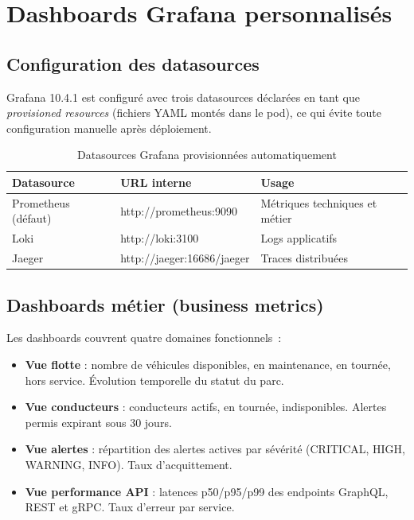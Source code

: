 \documentclass[12pt,a4paper]{article}
\begin{document}
\section{Dashboards Grafana personnalis\'{e}s}

\subsection{Configuration des datasources}

Grafana 10.4.1 est configur\'{e} avec trois datasources d\'{e}clar\'{e}es en tant que
\textit{provisioned resources} (fichiers YAML mont\'{e}s dans le pod), ce qui
\'{e}vite toute configuration manuelle apr\`{e}s d\'{e}ploiement.

\begin{table}[H]
\centering
\small
\renewcommand{\arraystretch}{1.4}
\begin{tabular}{
  >{\raggedright\arraybackslash}p{3.2cm}
  >{\ttfamily\raggedright\arraybackslash}p{6cm}
  >{\raggedright\arraybackslash}p{4.5cm}
}
\toprule
\rowcolor{secondary}
\normalfont\textbf{Datasource} & \normalfont\textbf{URL interne} & \normalfont\textbf{Usage} \\
\midrule
Prometheus (d\'{e}faut) & http://prometheus:9090    & M\'{e}triques techniques et m\'{e}tier \\
\rowcolor{rowgray}
Loki                & http://loki:3100           & Logs applicatifs \\
Jaeger              & http://jaeger:16686/jaeger & Traces distribu\'{e}es \\
\bottomrule
\end{tabular}
\caption{Datasources Grafana provisionn\'{e}es automatiquement}
\end{table}

\subsection{Dashboards m\'{e}tier (business metrics)}

Les dashboards couvrent quatre domaines fonctionnels~:

\begin{itemize}[leftmargin=*]
  \item \textbf{Vue flotte} : nombre de v\'{e}hicules disponibles, en maintenance,
        en tourn\'{e}e, hors service. \'{E}volution temporelle du statut du parc.
  \item \textbf{Vue conducteurs} : conducteurs actifs, en tourn\'{e}e, indisponibles.
        Alertes permis expirant sous 30 jours.
  \item \textbf{Vue alertes} : r\'{e}partition des alertes actives par s\'{e}v\'{e}rit\'{e}
        (CRITICAL, HIGH, WARNING, INFO). Taux d'acquittement.
  \item \textbf{Vue performance API} : latences p50/p95/p99 des endpoints
        GraphQL, REST et gRPC. Taux d'erreur par service.
\end{itemize}
\end{document}
